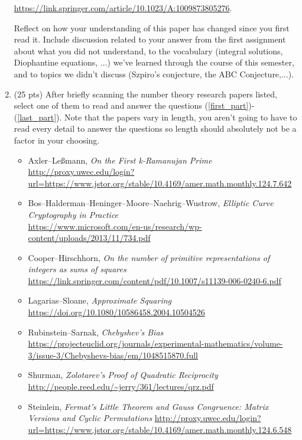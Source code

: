 \documentclass[12pt]{article}
\begin{document}
\begin{enumerate}
\begin{center}
			\url{https://link.springer.com/article/10.1023/A:1009873805276}. 
		\end{center}
		Reflect on how your understanding of this paper has changed since you first read it. Include discussion related to your answer from the first assignment about what you did not understand, to the vocabulary (integral solutions, Diophantine equations, ...) we've learned through the course of this semester, and to topics we didn't discuss (Szpiro's conjecture, the ABC Conjecture,...).
		\newpage
		\item (25 pts) After briefly scanning the number theory research papers listed, select one of them to read and answer the questions (\ref{first_part})-(\ref{last_part}). Note that the papers vary in length, you aren't going to have to read every detail to answer the questions so length should absolutely not be a factor in your choosing.
		\begin{itemize}
			\item Axler--Le\ss mann, \textit{On the First k-Ramanujan Prime}\\ \url{http://proxy.uwec.edu/login?url=https://www.jstor.org/stable/10.4169/amer.math.monthly.124.7.642}
			\item Bos--Halderman--Heninger--Moore--Naehrig--Wustrow, \textit{Elliptic Curve Cryptography in Practice}\\
			\url{https://www.microsoft.com/en-us/research/wp-content/uploads/2013/11/734.pdf}
			\item Cooper--Hirschhorn, \textit{On the number of primitive representations of integers as sums of squares}\\ \url{https://link.springer.com/content/pdf/10.1007/s11139-006-0240-6.pdf}
			\item Lagarias--Sloane, \textit{Approximate Squaring}\\
			\url{https://doi.org/10.1080/10586458.2004.10504526}
			\item Rubinstein--Sarnak, \textit{Chebyshev's Bias}\\
			\url{https://projecteuclid.org/journals/experimental-mathematics/volume-3/issue-3/Chebyshevs-bias/em/1048515870.full}
			\item Shurman, \textit{Zolotarev's Proof of Quadratic Reciprocity}\\
			\url{http://people.reed.edu/~jerry/361/lectures/qrz.pdf}
			\item Steinlein, \textit{Fermat's Little Theorem and Gauss Congruence: Matrix Versions and Cyclic Permutations} \url{http://proxy.uwec.edu/login?url=https://www.jstor.org/stable/10.4169/amer.math.monthly.124.6.548}

\end{itemize}
\end{enumerate}
\end{document}
